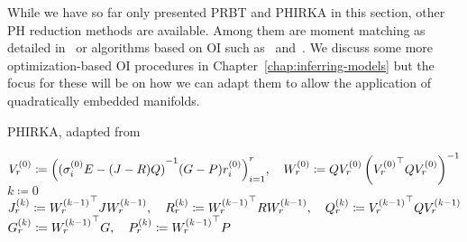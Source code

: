 \begin{remark}
    While we have so far only presented \ac{PRBT} and \ac{PHIRKA} in this section, other \ac{PH} reduction methods are available.
    Among them are moment matching as detailed in~\cite{Polyuga2010} or algorithms based on \ac{OI} such as~\cite{BGD2020} and~\cite{Lee2022}.
    We discuss some more optimization-based \ac{OI} procedures in Chapter~\ref{chap:inferring-models} but the focus for these will be on how we can adapt them to allow the application of quadratically embedded manifolds.
\end{remark}

\begin{algorithm}[ht]\label{alg:ph-irka}
    \caption{\ac{PHIRKA}, adapted from~\cite[Algorithm~1]{Gugercin2012}}
    $V_r^{(0)} \coloneqq {\left( {(\sigma_i^{(0)} E - (J - R) Q)}\inv (G - P) r_i^{(0)} \right)}_{i = 1}^r,\quad W_r^{(0)} \coloneqq Q V_r^{(0)} \left( {V_r^{(0)}}\trans Q V_r^{(0)} \right)\inv$\;
    $k \coloneqq 0$\;
    $J_r^{(k)} \coloneqq {W_r^{(k - 1)}}^{\top} J W_r^{(k - 1)},\quad R_r^{(k)} \coloneqq {W_r^{(k - 1)}}^{\top} R W_r^{(k - 1)},\quad Q_r^{(k)} \coloneqq {V_r^{(k - 1)}}^{\top} Q V_r^{(k - 1)}$\;
    $G_r^{(k)} \coloneqq {W_r^{(k - 1)}}^{\top} G,\quad P_r^{(k)} \coloneqq {W_r^{(k - 1)}}^{\top} P$\;
\end{algorithm}

